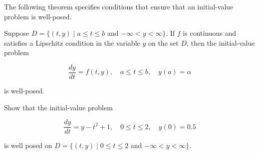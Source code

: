The following theorem specifies conditions that ensure that an initial-value problem is well-posed.

\begin{theorem}\label{thm:wellposedcond}
Suppose $D=\{(t, y) \mid a \leq t \leq b$ and $-\infty<y<\infty\}$. If $f$ is continuous and satisfies a Lipschitz condition in the variable $y$ on the set $D$, then the initial-value problem

$$
\frac{d y}{d t}=f(t, y), \quad a \leq t \leq b, \quad y(a)=\alpha
$$

is well-posed.
\end{theorem}

\begin{example}
Show that the initial-value problem

\begin{equation}\label{eqn:ivpeam3eq}
\frac{d y}{d t}=y-t^{2}+1, \quad 0 \leq t \leq 2, \quad y(0)=0.5
\end{equation}


is well posed on $D=\{(t, y) \mid 0 \leq t \leq 2$ and $-\infty<y<\infty\}$.
\end{example}

